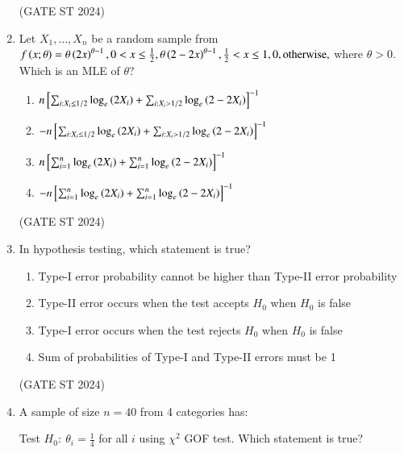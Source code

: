 \documentclass[journal,12pt,onecolumn]{IEEEtran}
\theoremstyle{remark}
\begin{document}
\begin{enumerate}
\begin{enumerate}
\end{enumerate}
\hfill (GATE ST 2024)
\item 
Let $X_1,\dots,X_n$ be a random sample from
$
f\left(x;\theta\right) =
\theta \left(2x\right)^{\theta-1},  0 < x \le \frac12, \\
\theta \left(2 - 2x\right)^{\theta-1},  \frac12 < x \le 1, \\
0,  \text{otherwise},
$
where $\theta>0$. Which is an MLE of $\theta$?

\begin{enumerate}
\item $ n{}\left[ \sum_{i:X_i\le 1/2} \log_e\left(2X_i\right) + \sum_{i:X_i>1/2} \log_e\left(2-2X_i\right) \right]^{-1}$
\item $ -n{}\left[ \sum_{i:X_i\le 1/2} \log_e\left(2X_i\right) + \sum_{i:X_i>1/2} \log_e\left(2-2X_i\right) \right]^{-1}$
\item $ n{}\left[ \sum_{i=1}^n \log_e\left(2X_i\right) + \sum_{i=1}^n \log_e\left(2-2X_i\right) \right]^{-1}$
\item $ -n{}\left[ \sum_{i=1}^n \log_e\left(2X_i\right) + \sum_{i=1}^n \log_e\left(2-2X_i\right) \right]^{-1}$
\end{enumerate}
\hfill (GATE ST 2024)
\item 
In hypothesis testing, which statement is true?

\begin{enumerate}
\item Type-I error probability cannot be higher than Type-II error probability
\item Type-II error occurs when the test accepts $H_0$ when $H_0$ is false
\item Type-I error occurs when the test rejects $H_0$ when $H_0$ is false
\item Sum of probabilities of Type-I and Type-II errors must be 1

\end{enumerate}
\hfill (GATE ST 2024)
\item
A sample of size $n=40$ from 4 categories has:




Test $H_0:\ \theta_i = \frac14$ for all $i$ using $\chi^2$ GOF test. Which statement is true?


\end{enumerate}
\end{document}
